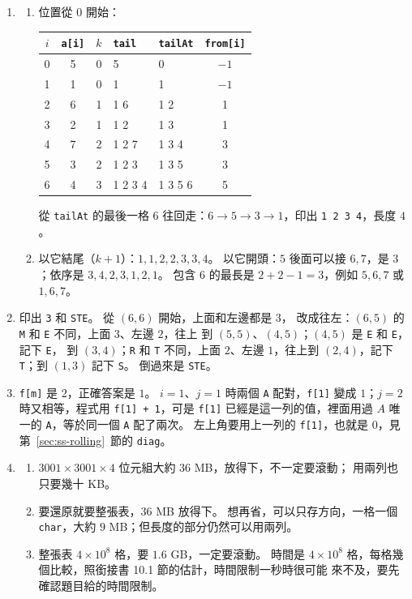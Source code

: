 \begin{enumerate}
\item
\begin{enumerate}
\item 位置從 $0$ 開始：
\begin{center}
\begin{tabular}{cccllc}
\toprule
$i$ & \texttt{a[i]} & $k$ & \texttt{tail} & \texttt{tailAt} & \texttt{from[i]} \\
\midrule
0 & 5 & 0 & 5 & 0 & $-1$ \\
1 & 1 & 0 & 1 & 1 & $-1$ \\
2 & 6 & 1 & 1 6 & 1 2 & 1 \\
3 & 2 & 1 & 1 2 & 1 3 & 1 \\
4 & 7 & 2 & 1 2 7 & 1 3 4 & 3 \\
5 & 3 & 2 & 1 2 3 & 1 3 5 & 3 \\
6 & 4 & 3 & 1 2 3 4 & 1 3 5 6 & 5 \\
\bottomrule
\end{tabular}
\end{center}
從 \texttt{tailAt} 的最後一格 $6$ 往回走：$6 \to 5 \to 3 \to 1$，印出
\texttt{1 2 3 4}，長度 $4$。
\item 以它結尾（$k + 1$）：$1, 1, 2, 2, 3, 3, 4$。 以它開頭：$5$ 後面可以接
$6, 7$，是 $3$；依序是 $3, 4, 2, 3, 1, 2, 1$。 包含 $6$ 的最長是
$2 + 2 - 1 = 3$，例如 $5, 6, 7$ 或 $1, 6, 7$。
\end{enumerate}

\item 印出 \texttt{3} 和 \texttt{STE}。 從 $(6, 6)$ 開始，上面和左邊都是 $3$，
改成往左：$(6, 5)$ 的 \texttt{M} 和 \texttt{E} 不同，上面 $3$、左邊 $2$，往上
到 $(5, 5)$、$(4, 5)$；$(4, 5)$ 是 \texttt{E} 和 \texttt{E}，記下 \texttt{E}，
到 $(3, 4)$；\texttt{R} 和 \texttt{T} 不同，上面 $2$、左邊 $1$，往上到
$(2, 4)$，記下 \texttt{T}；到 $(1, 3)$ 記下 \texttt{S}。 倒過來是
\texttt{STE}。

\item \texttt{f[m]} 是 $2$，正確答案是 $1$。 $i = 1$、$j = 1$ 時兩個
\texttt{A} 配對，\texttt{f[1]} 變成 $1$；$j = 2$ 時又相等，程式用
\texttt{f[1] + 1}，可是 \texttt{f[1]} 已經是這一列的值，裡面用過 $A$ 唯一的
\texttt{A}，等於同一個 \texttt{A} 配了兩次。 左上角要用上一列的
\texttt{f[1]}，也就是 $0$，見第~\ref{sec:ss-rolling}~節的 \texttt{diag}。

\item
\begin{enumerate}
\item $3001 \times 3001 \times 4$ 位元組大約 $36$ MB，放得下，不一定要滾動；
用兩列也只要幾十 KB。
\item 要還原就要整張表，$36$ MB 放得下。 想再省，可以只存方向，一格一個
\texttt{char}，大約 $9$ MB；但長度的部分仍然可以用兩列。
\item 整張表 $4 \times 10^8$ 格，要 $1.6$ GB，一定要滾動。 時間是
$4 \times 10^8$ 格，每格幾個比較，照銜接書 10.1 節的估計，時間限制一秒時很可能
來不及，要先確認題目給的時間限制。
\end{enumerate}


\end{enumerate}
